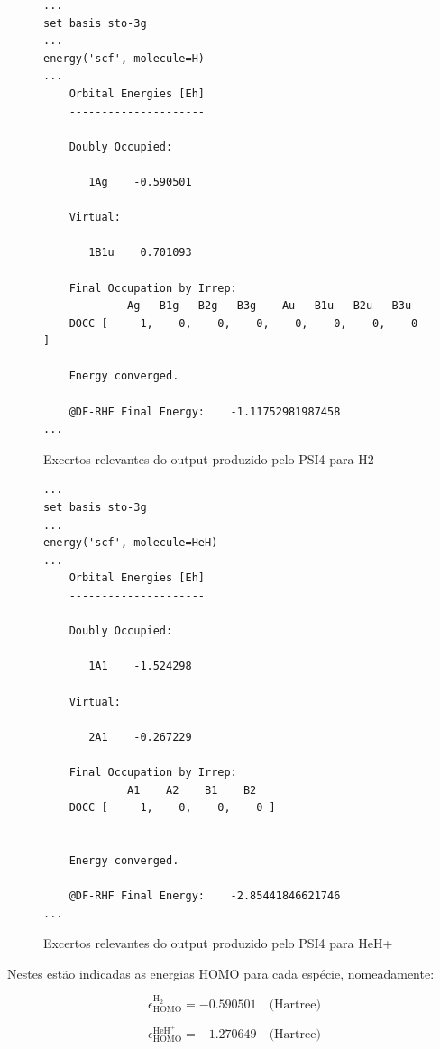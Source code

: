 \documentclass[portuguese,]{article}
\begin{document}
\begin{figure}[htb]
\begin{lstlisting}
...
set basis sto-3g
...
energy('scf', molecule=H)
...
    Orbital Energies [Eh]
    ---------------------

    Doubly Occupied:                                                      

       1Ag    -0.590501  

    Virtual:                                                              

       1B1u    0.701093  

    Final Occupation by Irrep:
             Ag   B1g   B2g   B3g    Au   B1u   B2u   B3u 
    DOCC [     1,    0,    0,    0,    0,    0,    0,    0 ]

    Energy converged.

    @DF-RHF Final Energy:    -1.11752981987458
...
\end{lstlisting}
\caption{Excertos relevantes do output produzido pelo PSI4 para H2}
\label{output:Hmin}
\end{figure}

\begin{figure}[htb]
\begin{lstlisting}
...
set basis sto-3g
...
energy('scf', molecule=HeH)
...
    Orbital Energies [Eh]
    ---------------------

    Doubly Occupied:                                                      

       1A1    -1.524298  

    Virtual:                                                              

       2A1    -0.267229  

    Final Occupation by Irrep:
             A1    A2    B1    B2 
    DOCC [     1,    0,    0,    0 ]


    Energy converged.

    @DF-RHF Final Energy:    -2.85441846621746
...
\end{lstlisting}
\caption{Excertos relevantes do output produzido pelo PSI4 para HeH+}
\label{output:HeHmin}
\end{figure}

Nestes estão indicadas as energias HOMO para cada espécie, nomeadamente:

\[ \epsilon^{\text{H}_2}_{\text{HOMO}}   = -0.590501 \quad \text{(Hartree)} \]

\[ \epsilon^{\text{HeH}^+}_{\text{HOMO}} = -1.270649 \quad \text{(Hartree)} \]
\end{document}
